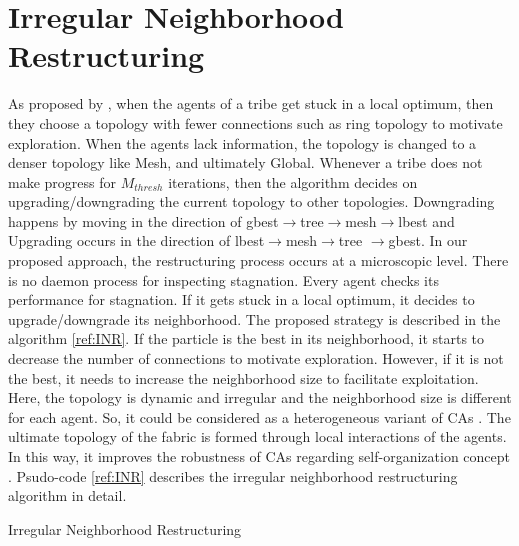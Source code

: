 \section{Irregular Neighborhood Restructuring}
As proposed by \citet{ali2016leveraged}, when the agents of a tribe get stuck in a local optimum, then they choose a topology with fewer connections such as ring topology to motivate exploration. When the agents lack information, the topology is changed to a denser topology like Mesh, and ultimately Global. Whenever a tribe does not make progress for $M_{thresh}$ iterations, then the algorithm decides on upgrading/downgrading the current topology to other topologies. Downgrading happens by moving in the direction of gbest$\rightarrow$tree$\rightarrow$mesh$\rightarrow$lbest and Upgrading occurs in the direction of lbest$\rightarrow$mesh$\rightarrow$tree $\rightarrow$gbest. In our proposed approach, the restructuring process occurs at a microscopic level. There is no daemon process for inspecting stagnation. Every agent checks its performance for stagnation. If it gets stuck in a local optimum, it decides to upgrade/downgrade its neighborhood. The proposed strategy is described in the algorithm \ref{ref:INR}. If the particle is the best in its neighborhood, it starts to decrease the number of connections to motivate exploration. However, if it is not the best, it needs to increase the neighborhood size to facilitate exploitation. Here, the topology is dynamic and irregular and the neighborhood size is different for each agent. So, it could be considered as a heterogeneous variant of CAs \citet{de2009heterogeneous}. The ultimate topology of the fabric is formed through local interactions of the agents. In this way, it improves the robustness of CAs regarding self-organization concept \citet{kennedy2001swarm}. Psudo-code \ref{ref:INR} describes the irregular neighborhood restructuring algorithm in detail.
\begin{algorithm}{	}
	\caption{Irregular Neighborhood Restructuring}			
\label{ref:INR}
\end{algorithm}
